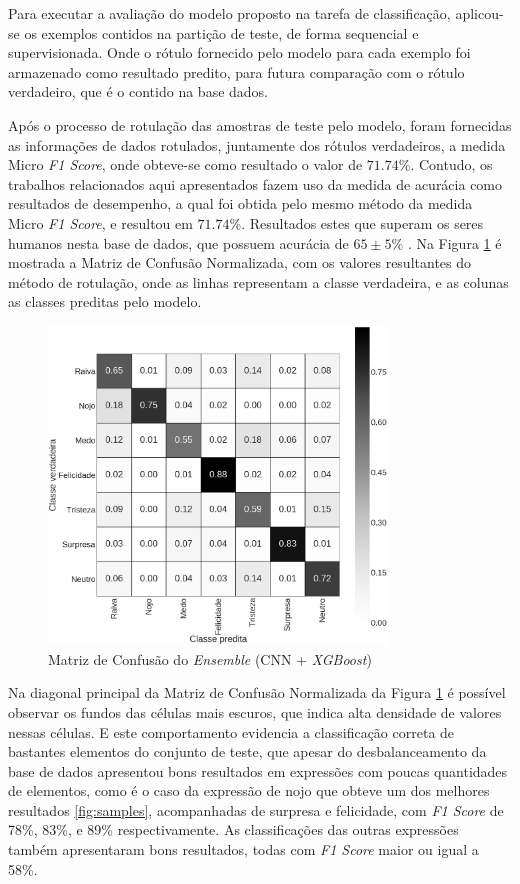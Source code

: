 Para executar a avaliação do modelo proposto na tarefa de classificação, aplicou-se os exemplos contidos na partição de teste, de forma sequencial e supervisionada. Onde o rótulo fornecido pelo modelo para cada exemplo foi armazenado como resultado predito, para futura comparação com o rótulo verdadeiro, que é o contido na base dados.

Após o processo de rotulação das amostras de teste pelo modelo, foram fornecidas as informações de dados rotulados, juntamente dos rótulos verdadeiros, a medida Micro \textit{F1 Score}, onde obteve-se como resultado o valor de $71.74$\%. Contudo, os trabalhos relacionados aqui apresentados fazem uso da medida de acurácia como resultados de desempenho, a qual foi obtida pelo mesmo método da medida Micro \textit{F1 Score}, e resultou em $71.74$\%. Resultados estes que superam os seres humanos nesta base de dados, que possuem acurácia de $65\pm5$\% \cite{goodfellow2013challenges}. Na Figura \ref{fig:emsemble} é mostrada a Matriz de Confusão Normalizada, com os valores resultantes do método de rotulação, onde as linhas representam a classe verdadeira, e as colunas as classes preditas pelo modelo.

\begin{figure}[!htb]
    \centering
    \includegraphics[width=9cm]{images/cm_emsemble.png}
    \caption{Matriz de Confusão do \emph{Ensemble} (CNN + \emph{XGBoost})}
    \label{fig:emsemble}
\end{figure}

Na diagonal principal da Matriz de Confusão Normalizada da Figura \ref{fig:emsemble} é possível observar os fundos das células mais escuros, que indica alta densidade de valores nessas células. E este comportamento evidencia a classificação correta de bastantes elementos do conjunto de teste, que apesar do desbalanceamento da base de dados apresentou bons resultados em expressões com poucas quantidades de elementos, como é o caso da expressão de nojo que obteve um dos melhores resultados \ref{fig:samples}, acompanhadas de surpresa e felicidade, com \textit{F1 Score} de 78\%, 83\%, e 89\% respectivamente. As classificações das outras expressões também apresentaram bons resultados, todas com \textit{F1 Score} maior ou igual a 58\%.

